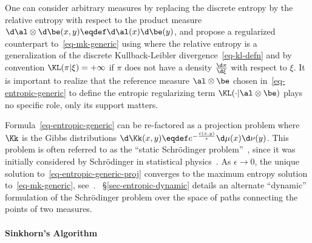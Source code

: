 \begin{rem}
One can consider arbitrary measures by replacing the discrete entropy by the relative entropy with respect to the product measure $\d\al\otimes\d\be(x,y) \eqdef \d\al(x)\d\be(y)$, and propose a regularized counterpart to~\eqref{eq-mk-generic} using
where the relative entropy is a generalization of the discrete Kullback-Leibler divergence~\eqref{eq-kl-defn}
and by convention $\KL(\pi|\xi)=+\infty$ if $\pi$ does not have a density $\frac{\d \pi}{\d\xi}$ with respect to $\xi$. 
%
It is important to realize that the reference measure $\al\otimes\be$ chosen in~\eqref{eq-entropic-generic} to define the entropic regularizing term $\KL(\cdot|\al\otimes\be)$ plays no specific role, only its support matters.

Formula~\eqref{eq-entropic-generic} can be re-factored as a projection problem
\eql{\label{eq-entropic-generic-proj}
	\umin{\pi \in \Couplings(\al,\be)} \KL(\pi|\Kk)
}
where $\Kk$ is the Gibbs distributions $\d\Kk(x,y) \eqdef e^{-\frac{c(x,y)}{\epsilon}} \d\mu(x)\d\nu(y)$.
%
This problem is often referred to as the ``static Schr\"odinger problem''~\cite{LeonardSchroedinger,RuschendorfThomsen}, since it was initially considered by Schr\"odinger in statistical physics~\cite{Schroedinger31}. 
%
As $\epsilon \rightarrow 0$, the unique solution to~\eqref{eq-entropic-generic-proj} converges to the maximum entropy solution to~\eqref{eq-mk-generic}, see~\cite{leonard2012schrodinger,2017-carlier-SIMA}.
%
~\S\ref{sec-entropic-dynamic} details an alternate ``dynamic'' formulation of the Schr\"odinger problem over the space of paths connecting the points of two measures.
\end{rem}




\paragraph{Sinkhorn's Algorithm}

